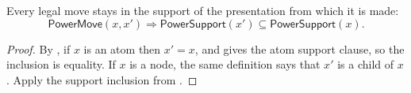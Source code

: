 \begin{lemma}
Every legal move stays in the support of the presentation from which it is
made:
\[
\mathsf{PowerMove}(x,x')\Longrightarrow
\mathsf{PowerSupport}(x')\subseteq\mathsf{PowerSupport}(x).
\]
\end{lemma}
\begin{proof}
By , if $x$ is an atom then $x'=x$, and 
gives the atom support clause, so the inclusion is equality.  If $x$ is a
node, the same definition says that $x'$ is a child of $x$.  Apply the support
inclusion from .
\end{proof}
